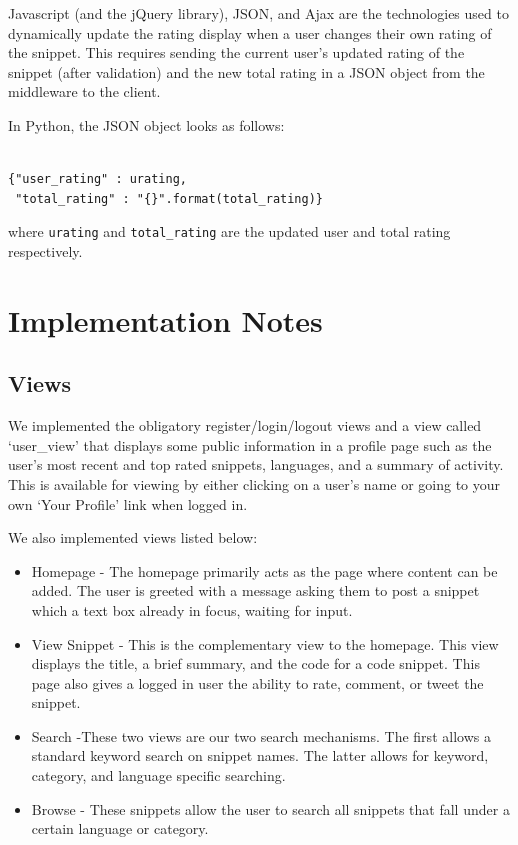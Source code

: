 \documentclass{sig-alt-release2}
\begin{document}
Javascript (and the jQuery library), JSON, and Ajax are the
technologies used to dynamically update the rating display when a user
changes their own rating of the snippet. This requires sending the
current user's updated rating of the snippet (after validation) and the
new total rating in a JSON object from the middleware to the client.

In Python, the JSON object looks as follows:

\begin{verbatim}

{"user_rating" : urating,
 "total_rating" : "{}".format(total_rating)}

\end{verbatim}

where \texttt{urating} and \texttt{total\_rating} are the updated user
and total rating respectively.

\section{Implementation Notes}

\subsection{Views}

We implemented the obligatory register/login/logout views and a view called
`user\_view' that displays some public information in a profile page such as
the user's most recent and top rated snippets, languages, and a summary of
activity. This is available for viewing by either clicking on a user's name
or going to your own `Your Profile' link when logged in.

We also implemented views listed below:

\begin{itemize}
\item Homepage - The homepage primarily acts as the page where content
can be added. The user is greeted with a message asking them to post a snippet
which a text box already in focus, waiting for input.

\item View Snippet - This is the complementary view to the 
homepage. This view displays the title, a brief summary, and the code for a 
code snippet. This page also gives a logged in user the ability to rate,
comment, or tweet the snippet.

\item Search  -These two views are our
two search mechanisms. The first allows a standard keyword search on snippet
names. The latter allows for keyword, category, and language specific searching.

\item Browse -
These snippets allow the user to search all snippets that fall under a certain
language or category.
\end{itemize}
\end{document}
